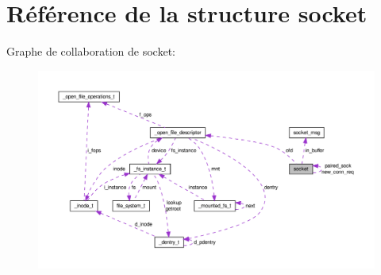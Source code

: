\hypertarget{structsocket}{\section{Référence de la structure socket}
\label{structsocket}
}


Graphe de collaboration de socket\-:\nopagebreak
\begin{figure}[H]
\begin{center}
\leavevmode
\includegraphics[width=350pt]{structsocket__coll__graph}
\end{center}
\end{figure}

